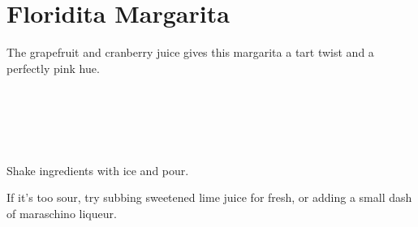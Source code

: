 \section[Floridita Margarita]{Floridita Margarita~\vegan}


\begin{recipestats}[
	servings=1,
	preptime=5 \minute,
	source=\citefield{cointreauFloridita}{shorttitle}\cite{cointreauFloridita},
]
\end{recipestats}


\begin{recipeabstract}
	The grapefruit and cranberry juice gives this margarita a tart twist and a perfectly pink hue.
\end{recipeabstract}


\begin{ingredientcolumns}[1]
	\begin{ingredientblock}
		\\
		\\
		\\
		\\
	\end{ingredientblock}
\end{ingredientcolumns}


\begin{preparation}
\item Shake ingredients with ice and pour.
\end{preparation}


\begin{variation}
\item If it's too sour, try subbing sweetened lime juice for fresh, or adding a small dash of maraschino liqueur.
\end{variation}


\recipeend
